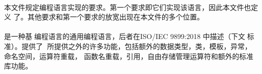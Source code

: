\paragraph{}
本文件规定\cpp{}编程语言实现的要求。第一个要求即它们实现该语言，因此本文件也定义
了\cpp{}。其他要求和第一个要求的放宽出现在本文件的多个位置。

\paragraph{}
\cpp{}是一种基于\c{}编程语言的通用编程语言，后者在ISO/IEC 9899:2018
中描述（下文称\c{}标准）。\cpp{}提供了除\c{}
所提供之外的许多功能，包括额外的数据类型，类，模板，异常，命名空间，运算符重载，
函数名重载，引用，自由存储管理运算符和额外的标准库功能。
